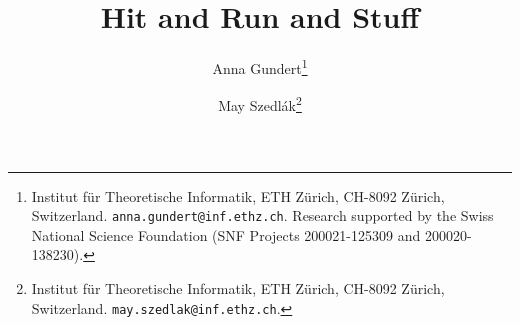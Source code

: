 \documentclass[a4paper,11pt]{article}
\theoremstyle{plain}
\theoremstyle{definition}
\theoremstyle{remark}
\newcommand{\1}{\mathbf{1}}
\begin{document}
\linenumbers

\title{Hit and Run and Stuff}
\author{Anna Gundert\footnote{Institut f\"{u}r Theoretische Informatik, ETH Z\"{u}rich, CH-8092 Z\"{u}rich, Switzerland. \texttt{anna.gundert@inf.ethz.ch}. Research supported by the Swiss National Science Foundation (SNF Projects 200021-125309 and 200020-138230).} \and May Szedl\'ak\footnote{Institut f\"{u}r Theoretische Informatik, ETH Z\"{u}rich, CH-8092 Z\"{u}rich, Switzerland. \texttt{may.szedlak@inf.ethz.ch}.}}

\begin{titlepage}
\maketitle
\thispagestyle{empty}

\end{titlepage}



%
%



%
\end{document}
